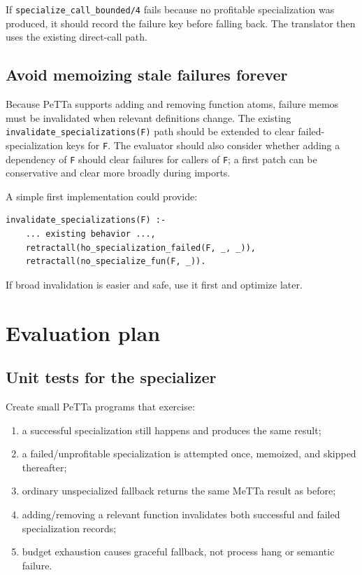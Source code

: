 \documentclass[11pt]{article}
\begin{document}
If \texttt{specialize\_call\_bounded/4} fails because no profitable specialization was produced, it should record the failure key before falling back. The translator then uses the existing direct-call path.

\subsection{Avoid memoizing stale failures forever}

Because PeTTa supports adding and removing function atoms, failure memos must be invalidated when relevant definitions change. The existing \texttt{invalidate\_specializations(F)} path should be extended to clear failed-specialization keys for \texttt{F}. The evaluator should also consider whether adding a dependency of \texttt{F} should clear failures for callers of \texttt{F}; a first patch can be conservative and clear more broadly during imports.

A simple first implementation could provide:

\begin{lstlisting}
invalidate_specializations(F) :-
    ... existing behavior ...,
    retractall(ho_specialization_failed(F, _, _)),
    retractall(no_specialize_fun(F, _)).
\end{lstlisting}

If broad invalidation is easier and safe, use it first and optimize later.

\section{Evaluation plan}

\subsection{Unit tests for the specializer}

Create small PeTTa programs that exercise:

\begin{enumerate}[nosep]
\item a successful specialization still happens and produces the same result;
\item a failed/unprofitable specialization is attempted once, memoized, and skipped thereafter;
\item ordinary unspecialized fallback returns the same MeTTa result as before;
\item adding/removing a relevant function invalidates both successful and failed specialization records;
\item budget exhaustion causes graceful fallback, not process hang or semantic failure.
\end{enumerate}
\end{document}
